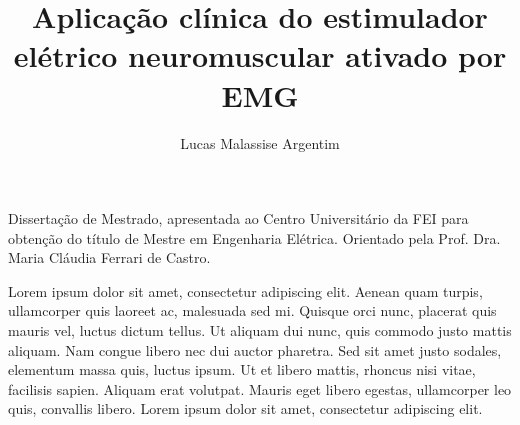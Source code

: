 \documentclass[rascunho,xindy]{fei}
\author{Lucas Malassise Argentim}
\title{Aplicação clínica do estimulador elétrico neuromuscular ativado por EMG}
\begin{document}
\maketitle

\begin{folhaderosto}
Dissertação de Mestrado, apresentada ao Centro Universitário da FEI para obtenção do título de Mestre em Engenharia Elétrica. Orientado pela Prof. Dra. Maria Cláudia Ferrari de Castro.
\end{folhaderosto}

\fichacatalografica

\folhadeaprovacao


\begin{agradecimentos}

Lorem ipsum dolor sit amet, consectetur adipiscing elit. Aenean quam turpis, ullamcorper quis laoreet ac, malesuada sed mi. Quisque orci nunc, placerat quis mauris vel, luctus dictum tellus. Ut aliquam dui nunc, quis commodo justo mattis aliquam. Nam congue libero nec dui auctor pharetra. Sed sit amet justo sodales, elementum massa quis, luctus ipsum. Ut et libero mattis, rhoncus nisi vitae, facilisis sapien. Aliquam erat volutpat. Mauris eget libero egestas, ullamcorper leo quis, convallis libero. Lorem ipsum dolor sit amet, consectetur adipiscing elit.

\end{agradecimentos}


\end{document}
